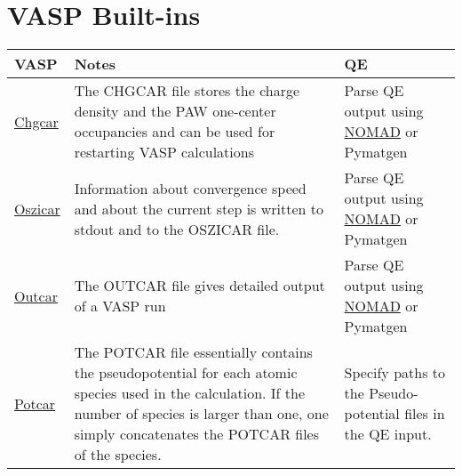 \documentclass[12pt]{article}
\begin{document}
\newpage
\section*{VASP Built-ins}
\begin{center}
\begin{table}[ht]
\begin{tabularx}{\linewidth}{|>{\RaggedRight}p{2.5cm}|x|x|}\hline
 VASP  & Notes & QE \\ \hline

 \href{https://www.vasp.at/wiki/index.php/CHGCAR}{Chgcar} &
 The CHGCAR file stores the charge density and the PAW one-center occupancies and can be used for restarting VASP calculations &
Parse QE output using \href{https://github.com/nomad-coe/nomad-parser-quantum-espresso}{NOMAD} or Pymatgen  \\ \hline
 
 \href{https://www.vasp.at/wiki/index.php/OSZICAR}{Oszicar} &
 Information about convergence speed and about the current step is written to stdout and to the OSZICAR file. &
Parse QE output using \href{https://github.com/nomad-coe/nomad-parser-quantum-espresso}{NOMAD} or Pymatgen  \\ \hline
 
 \href{https://www.vasp.at/wiki/index.php/OUTCAR}{Outcar} &
 The OUTCAR file gives detailed output of a VASP run &
Parse QE output using \href{https://github.com/nomad-coe/nomad-parser-quantum-espresso}{NOMAD} or Pymatgen \\ \hline
 
 \href{https://www.vasp.at/wiki/index.php/POTCAR}{Potcar} &
 The POTCAR file essentially contains the pseudopotential for each atomic species used in the calculation. If the number of species is larger than one, one simply concatenates the POTCAR files of the species. &
 Specify paths to the Pseudo-potential files in the QE input.  \\ \hline
\end{tabularx}
\end{table}
\end{center}
\newpage

\end{document}

